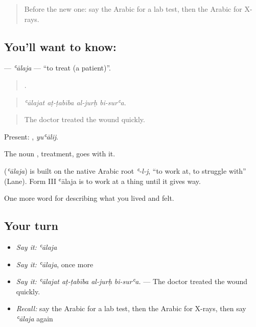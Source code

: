 \label{lesson:AR-C510-alaja}



\begin{quote}
Before the new one: say the Arabic for a lab test, then the Arabic for X-rays.
\end{quote}

\subsection*{You'll want to know: }
\textbf{} — \emph{ʿālaja} — \textquotedblleft{}to treat (a patient)\textquotedblright{}.

\begin{quote}
   .
\end{quote}

\begin{quote}
\emph{ʿālajat aṭ-ṭabība al-jurḥ bi-surʿa.}
\end{quote}

\begin{quote}
The doctor treated the wound quickly.
\end{quote}

Present: , \emph{yuʿālij}.

The noun , treatment, goes with it.

\begin{cousinweb}
\textbf{} (\emph{ʿālaja}) is built on the native Arabic root \emph{ʿ-l-j}, \textquotedblleft{}to work at, to struggle with\textquotedblright{} (Lane). Form III ʿālaja is to work at a thing until it gives way.
\end{cousinweb}

\begin{grammarlens}[title={What you've built}]
One more word for describing what you lived and felt.
\end{grammarlens}

\subsection*{Your turn}
\begin{itemize}
\raggedright
  \item \emph{Say it:} \emph{ʿālaja}
  \item \emph{Say it:} \emph{ʿālaja}, once more
  \item \emph{Say it:} \emph{ʿālajat aṭ-ṭabība al-jurḥ bi-surʿa.} — The doctor treated the wound quickly.
  \item \emph{Recall:} say the Arabic for a lab test, then the Arabic for X-rays, then say \emph{ʿālaja} again
\end{itemize}

